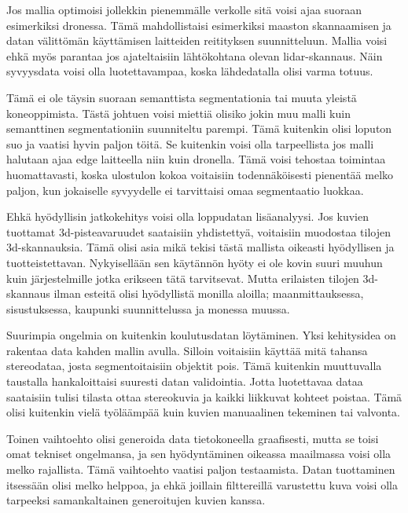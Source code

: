Jos mallia optimoisi jollekkin pienemmälle verkolle sitä voisi ajaa suoraan esimerkiksi dronessa.
Tämä mahdollistaisi esimerkiksi maaston skannaamisen ja datan välittömän käyttämisen laitteiden reitityksen suunnitteluun.
Mallia voisi ehkä myös parantaa jos ajateltaisiin lähtökohtana olevan lidar-skannaus.
Näin syvyysdata voisi olla luotettavampaa, koska lähdedatalla olisi varma totuus. 

Tämä ei ole täysin suoraan semanttista segmentationia tai muuta yleistä koneoppimista.
Tästä johtuen voisi miettiä olisiko jokin muu malli kuin semanttinen segmentationiin suunniteltu parempi.
Tämä kuitenkin olisi loputon suo ja vaatisi hyvin paljon töitä.
Se kuitenkin voisi olla tarpeellista jos malli halutaan ajaa edge laitteella niin kuin dronella. 
Tämä voisi tehostaa toimintaa huomattavasti, koska ulostulon kokoa voitaisiin todennäköisesti pienentää melko paljon, kun jokaiselle syvyydelle ei tarvittaisi omaa segmentaatio luokkaa.

Ehkä hyödyllisin jatkokehitys voisi olla loppudatan lisäanalyysi.
Jos kuvien tuottamat 3d-pisteavaruudet saataisiin yhdistettyä, voitaisiin muodostaa tilojen 3d-skannauksia.
Tämä olisi asia mikä tekisi tästä mallista oikeasti hyödyllisen ja tuotteistettavan.
Nykyisellään sen käytännön hyöty ei ole kovin suuri muuhun kuin järjestelmille jotka erikseen tätä tarvitsevat.
Mutta erilaisten tilojen 3d-skannaus ilman esteitä olisi hyödyllistä monilla aloilla; maanmittauksessa, sisustuksessa, kaupunki suunnittelussa ja monessa muussa.

Suurimpia ongelmia on kuitenkin koulutusdatan löytäminen.
Yksi kehitysidea on rakentaa data kahden mallin avulla.
Silloin voitaisiin käyttää mitä tahansa stereodataa, josta segmentoitaisiin objektit pois.
Tämä kuitenkin muuttuvalla taustalla hankaloittaisi suuresti datan validointia.
Jotta luotettavaa dataa saataisiin tulisi tilasta ottaa stereokuvia ja kaikki liikkuvat kohteet poistaa.
Tämä olisi kuitenkin vielä työläämpää kuin kuvien manuaalinen tekeminen tai valvonta.

Toinen vaihtoehto olisi generoida data tietokoneella graafisesti,
mutta se toisi omat tekniset ongelmansa, ja sen hyödyntäminen oikeassa maailmassa voisi olla melko rajallista.
Tämä vaihtoehto vaatisi paljon testaamista.
Datan tuottaminen itsessään olisi melko helppoa,
ja ehkä joillain filttereillä varustettu kuva voisi olla tarpeeksi samankaltainen generoitujen kuvien kanssa.
